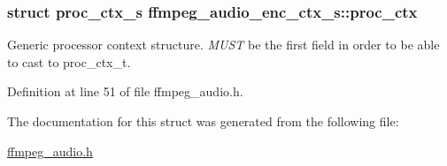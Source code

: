\subsubsection[{\texorpdfstring{proc\+\_\+ctx}{proc_ctx}}]{\setlength{\rightskip}{0pt plus 5cm}struct {\bf proc\+\_\+ctx\+\_\+s} ffmpeg\+\_\+audio\+\_\+enc\+\_\+ctx\+\_\+s\+::proc\+\_\+ctx}\hypertarget{structffmpeg__audio__enc__ctx__s_a356a724a749742706bb293f1443e3cc5}{}\label{structffmpeg__audio__enc__ctx__s_a356a724a749742706bb293f1443e3cc5}
Generic processor context structure. {\itshape M\+U\+ST} be the first field in order to be able to cast to proc\+\_\+ctx\+\_\+t. 

Definition at line 51 of file ffmpeg\+\_\+audio.\+h.



The documentation for this struct was generated from the following file\+:\begin{DoxyCompactItemize}
\item 
\hyperlink{ffmpeg__audio_8h}{ffmpeg\+\_\+audio.\+h}\end{DoxyCompactItemize}

